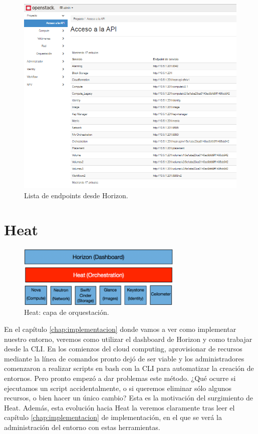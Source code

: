 \begin{figure}
    \centering
    \includegraphics[width=1\textwidth]{imagenes/capitulo4/endpointlistHorizon.png}
    \caption{Lista de endpoints desde Horizon.}
	\vspace{0.3cm}
    \label{DashboardInicio}
\end{figure}

\section{Heat} \label{subchap:heat}

\begin{figure}
    \centering
    \includegraphics[width=0.7\textwidth]{imagenes/capitulo4/coordinacionHEat.png}
    \caption{Heat: capa de orquestación.}
	\vspace{0.3cm}
    \label{CapaHeat}
\end{figure}

En el capítulo \ref{chap:implementacion} donde vamos a ver como implementar nuestro entorno, veremos como utilizar el dashboard de Horizon y como trabajar desde la CLI. En los comienzos del cloud computing, aprovisionar de recursos mediante la línea de comandos pronto dejó de ser viable y los administradores comenzaron a realizar scripts en bash con la CLI para automatizar la creación de entornos. Pero pronto empezó a dar problemas este método. ¿Qué ocurre si ejecutamos un script accidentalmente, o si queremos eliminar sólo algunos recursos, o bien hacer un único cambio? Esta es la motivación del surgimiento de Heat. Además, esta evolución hacia Heat la veremos claramente tras leer el capítulo \ref{chap:implementacion} de implementación, en el que se verá la administración del entorno con estas herramientas.

